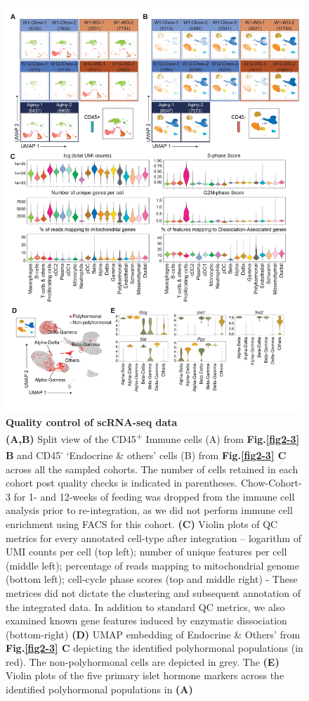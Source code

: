 \begin{figure}[htbp]
    \centering
    \includegraphics[width=13cm]{Appendix2/Fig/F2-A5-01.png}
    \caption[suppl-fig:sc-qc]{\textbf{Quality control of scRNA-seq data}\\
    \textbf{(A,B)} Split view of the CD45\textsuperscript{+} Immune cells (A) from \textbf{Fig.\ref{fig2-3} B} and CD45\textsuperscript{-} `Endocrine \& others’ cells (B) from \textbf{Fig.\ref{fig2-3} C} across all the sampled cohorts. The number of cells retained in each cohort post quality checks is indicated in parentheses. Chow-Cohort-3 for 1- and 12-weeks of feeding was dropped from the immune cell analysis prior to re-integration, as we did not perform immune cell enrichment using FACS for this cohort. \textbf{(C)} Violin plots of QC metrics for every annotated cell-type after integration – logarithm of UMI counts per cell (top left); number of unique features per cell (middle left); percentage of reads mapping to mitochondrial genome (bottom left); cell-cycle phase scores (top and middle right) - These metrices did not dictate the clustering and subsequent annotation of the integrated data. In addition to standard QC metrics, we also examined known gene features induced by enzymatic dissociation (bottom-right) \textbf{(D)} UMAP embedding of Endocrine \& Others' from \textbf{Fig.\ref{fig2-3} C} depicting the identified polyhormonal populations (in red). The non-polyhormonal cells are depicted in grey. The \textbf{(E)} Violin plots of the five primary islet hormone markers across the identified polyhormonal populations in \textbf{(A)}}
    \label{suppl_fig:sc_qc}
\end{figure}

